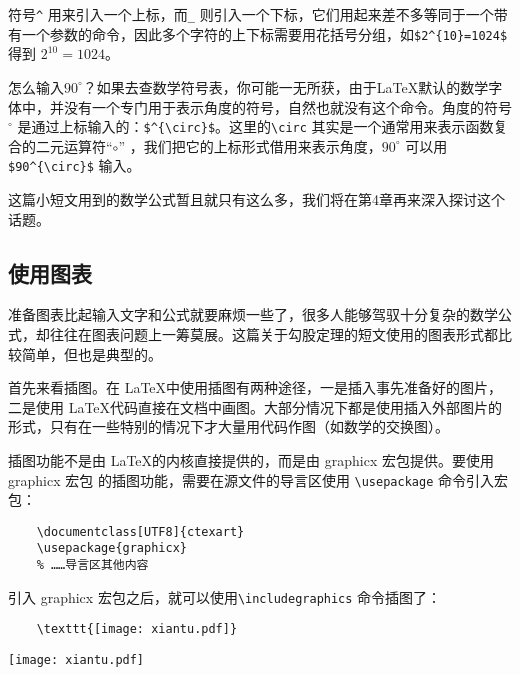 符号\verb|^| 用来引入一个上标，而\verb|_| 则引入一个下标，它们用起来差不多等同于一个带有一个参数的命令，因此多个字符的上下标需要用花括号分组，如\verb|$2^{10}=1024$| 得到 $2^{10}=1024$。

怎么输入$90^{\circ}$？如果去查数学符号表，你可能一无所获，由于\LaTeX 默认的数学字体中，并没有一个专门用于表示角度的符号，自然也就没有这个命令。角度的符号$^{\circ}$ 是通过上标输入的：\verb|$^{\circ}$|。这里的\verb|\circ| 其实是一个通常用来表示函数复合的二元运算符“$\circ$” ，我们把它的上标形式借用来表示角度，$90^{\circ}$ 可以用 \verb|$90^{\circ}$| 输入。

这篇小短文用到的数学公式暂且就只有这么多，我们将在第4章再来深入探讨这个话题。

\subsection{使用图表}

准备图表比起输入文字和公式就要麻烦一些了，很多人能够驾驭十分复杂的数学公式，却往往在图表问题上一筹莫展。这篇关于勾股定理的短文使用的图表形式都比较简单，但也是典型的。

首先来看插图。在 \LaTeX 中使用插图有两种途径，一是插入事先准备好的图片，二是使用 \LaTeX 代码直接在文档中画图。大部分情况下都是使用插入外部图片的形式，只有在一些特别的情况下才大量用代码作图（如数学的交换图）。

插图功能不是由 \LaTeX 的内核直接提供的，而是由 graphicx 宏包提供。要使用 graphicx 宏包 的插图功能，需要在源文件的导言区使用 \verb|\usepackage| 命令引入宏包：

\begin{lstlisting}
    \documentclass[UTF8]{ctexart}
    \usepackage{graphicx}
    % ……导言区其他内容
\end{lstlisting}

引入 graphicx 宏包之后，就可以使用\verb|\includegraphics| 命令插图了：

\begin{minipage}[t]{0.45\textwidth}
    \begin{lstlisting}
    \texttt{[image: xiantu.pdf]}
    \end{lstlisting}
\end{minipage}
\hfill
\begin{minipage}[m]{0.45\textwidth}
    \vspace{0.1cm}
    \hspace{2.5cm} \texttt{[image: xiantu.pdf]}
\end{minipage}

